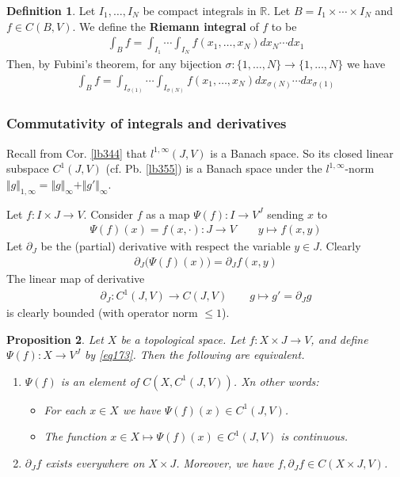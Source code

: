 \documentclass[12pt,b5paper,notitlepage]{article}
\theoremstyle{definition}
\newtheorem{df}{Definition}[section]
\theoremstyle{plain}
\newtheorem{pp}[df]{Proposition}
\newcommand{\Rbb}{\mathbb R}
\numberwithin{equation}{section}
\begin{document}
\begin{df}
Let $I_1,\dots,I_N$ be compact integrals in $\Rbb$. Let $B=I_1\times\cdots\times I_N$ and $f\in C(B,V)$. We define the \textbf{Riemann integral} of $f$ to be
\begin{align*}
\int_Bf=\int_{I_1}\cdots\int_{I_N}f(x_1,\dots,x_N)dx_N\cdots dx_1
\end{align*}
Then, by Fubini's theorem, for any bijection $\sigma:\{1,\dots,N\}\rightarrow\{1,\dots,N\}$ we have
\begin{align*}
\int_Bf=\int_{I_{\sigma(1)}}\cdots\int_{I_{\sigma(N)}}f(x_1,\dots,x_N)dx_{\sigma(N)}\cdots dx_{\sigma(1)}
\end{align*}
\end{df}


\subsubsection{Commutativity of integrals and derivatives}


Recall from Cor. \ref{lb344} that $l^{1,\infty}(J,V)$ is a Banach space. So its closed linear subspace $C^1(J,V)$ (cf. Pb. \ref{lb355}) is a Banach space under the $l^{1,\infty}$-norm $\Vert g\Vert_{1,\infty}=\Vert g\Vert_\infty+\Vert g'\Vert_\infty$.

Let $f:I\times J\rightarrow V$. Consider $f$ as a map $\Psi(f):I\rightarrow V^J$ sending $x$ to
\begin{align}
\Psi(f)(x)=f(x,\cdot):J\rightarrow V\qquad  y\mapsto f(x,y)  \label{eq173}
\end{align}
Let $\partial_J$ be the (partial) derivative with respect the variable $y\in J$. Clearly
\begin{align}
\partial_J\big(\Psi(f)(x)\big)=\partial_Jf(x,y)
\end{align}
The linear map of derivative
\begin{align}
\partial_J:C^1(J,V)\rightarrow C(J,V)\qquad g\mapsto g'=\partial_Jg
\end{align}
is clearly bounded (with operator norm $\leq 1$).

\begin{pp}\label{lb402}
Let $X$ be a topological space. Let $f:X\times J\rightarrow V$, and define $\Psi(f):X\rightarrow V^J$ by \eqref{eq173}. Then the following are equivalent.
\begin{enumerate}[label=(\arabic*)]
\item $\Psi(f)$ is an element of $C(X,C^1(J,V))$. Xn other words:
\begin{itemize}
\item[(1a)] For each $x\in X$ we have $\Psi(f)(x)\in C^1(J,V)$.
\item[(1b)] The function $x\in X\mapsto \Psi(f)(x)\in C^1(J,V)$ is continuous.
\end{itemize}
\item $\partial_Jf$ exists everywhere on $X\times J$. Moreover, we have $f,\partial_Jf\in C(X\times J,V)$. 
\end{enumerate}
\end{pp}
\end{document}
